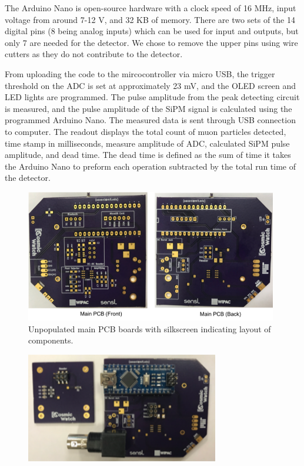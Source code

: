 \begin{itemize}
    The Arduino Nano is open-source hardware with a clock speed of 16 MHz, input voltage from around 7-12 V, and 32 KB of memory. There are two sets of the 14 digital pins (8 being analog inputs) which can be used for input and outputs, but only 7 are needed for the detector. We chose to remove the upper pins using wire cutters as they do not contribute to the detector. 

From uploading the code \cite{MIT_Code} to the  mircocontroller via micro USB, the trigger threshold on the ADC is set at approximately 23 mV, and the OLED screen and LED lights are programmed. The pulse amplitude from the peak detecting circuit is measured, and the pulse amplitude of the SiPM signal is calculated using the programmed Arduino Nano. The measured data is sent through USB connection to computer. The readout displays the total count of muon particles detected, time stamp in milliseconds, measure amplitude of ADC, calculated SiPM pulse amplitude, and dead time. The dead time is defined as the sum of time it takes the Arduino Nano to preform each operation subtracted by the total run time of the detector. 
\begin{figure}[htb]
\centering
\includegraphics[width=0.98\textwidth]{images/mainPCB.png} 
\caption{Unpopulated main PCB boards with silkscreen indicating layout of components.}
\label{MIT_mainPCB}
\end{figure}
\begin{figure}[htb]
\centering
\includegraphics[width=0.75\textwidth]{images/TopMainSiPMPOP.png} 

\end{figure}
\end{itemize}
